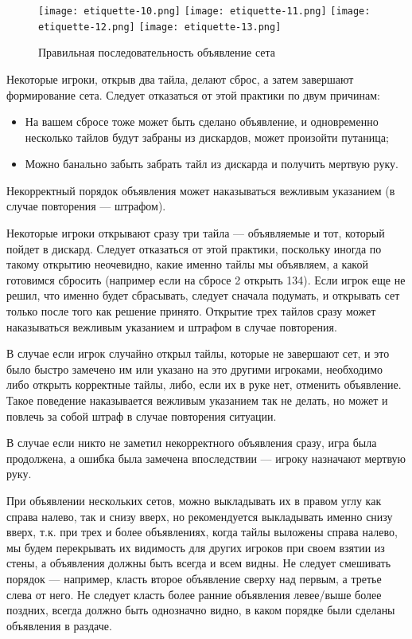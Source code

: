 \begin{figure}[H]
	\centering
	\texttt{[image: etiquette-10.png]}
	\texttt{[image: etiquette-11.png]}
	\texttt{[image: etiquette-12.png]}
	\texttt{[image: etiquette-13.png]}
	\caption{Правильная последовательность объявление сета}
\end{figure}

Некоторые игроки, открыв два тайла, делают сброс, а затем завершают формирование сета. Следует отказаться от этой практики по двум причинам:
\begin{itemize}
	\item На вашем сбросе тоже может быть сделано объявление, и одновременно несколько тайлов будут забраны из дискардов, может произойти путаница;
	\item Можно банально забыть забрать тайл из дискарда и получить мертвую руку.
\end{itemize}

Некорректный порядок объявления может наказываться вежливым указанием (в случае повторения --- штрафом).

Некоторые игроки открывают сразу три тайла --- объявляемые и тот, который пойдет в дискард. Следует отказаться от этой практики, поскольку иногда по такому открытию неочевидно, какие именно тайлы мы объявляем, а какой готовимся сбросить (например если на сбросе 2 открыть 134). Если игрок еще не решил, что именно будет сбрасывать, следует сначала подумать, и открывать сет только после того как решение принято. Открытие трех тайлов сразу может наказываться вежливым указанием и штрафом в случае повторения.

В случае если игрок случайно открыл тайлы, которые не завершают сет, и это было быстро замечено им или указано на это другими игроками, необходимо либо открыть корректные тайлы, либо, если их в руке нет, отменить объявление. Такое поведение наказывается вежливым указанием так не делать, но может и повлечь за собой штраф в случае повторения ситуации.

В случае если никто не заметил некорректного объявления сразу, игра была продолжена, а ошибка была замечена впоследствии --- игроку назначают мертвую руку.

При объявлении нескольких сетов, можно выкладывать их в правом углу как справа налево, так и снизу вверх, но рекомендуется выкладывать именно снизу вверх, т.к. при трех и более объявлениях, когда тайлы выложены справа налево, мы будем перекрывать их видимость для других игроков при своем взятии из стены, а объявления должны быть всегда и всем видны. Не следует смешивать порядок --- например, класть второе объявление сверху над первым, а третье слева от него. Не следует класть более ранние объявления левее/выше более поздних, всегда должно быть однозначно видно, в каком порядке были сделаны объявления в раздаче.

